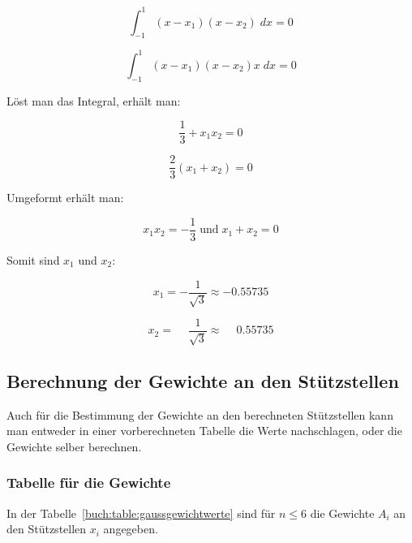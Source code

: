 \begin{equation*}
    \int_{-1}^{1}(x - x_{1})(x - x_{2}) \; dx = 0
\end{equation*}

\begin{equation*}
    \int_{-1}^{1}(x - x_{1})(x - x_{2})x \; dx = 0
\end{equation*}

\noindent
Löst man das Integral, erhält man:

\begin{equation*}
    \frac{1}{3} + x_{1}x_{2} = 0
\end{equation*}

\begin{equation}
    \frac{2}{3}(x_{1}+x_{2}) = 0
\end{equation}

\noindent
Umgeformt erhält man:

\begin{equation}
    x_{1}x_{2} = -\frac{1}{3}
    \;
    \text{und}
    \;
    x_{1}+x_{2} = 0
\end{equation}

\noindent
Somit sind $ x_{1} $ und $ x_{2} $:

\begin{equation*}
    x_{1} = -\frac{1}{\sqrt{3}} \approx -0.55735
\end{equation*}

\begin{equation}
    x_{2} = \phantom{-} \frac{1}{\sqrt{3}} \approx \phantom{-}0.55735
\end{equation}

\newpage

\subsection{Berechnung der Gewichte an den Stützstellen
\label{quadratur:subsection:gewichtsberechnung}}
Auch für die Bestimmung der Gewichte an den berechneten Stützstellen kann man entweder
in einer vorberechneten Tabelle die Werte nachschlagen, oder die Gewichte selber berechnen.

\subsubsection{Tabelle für die Gewichte}
In der Tabelle~\ref{buch:table:gaussgewichtwerte} sind für $ n \leq 6 $ die Gewichte $A_{i}$
an den Stützstellen $x_{i} $ angegeben.


